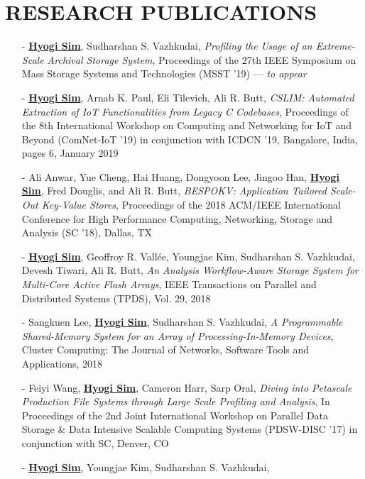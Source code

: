 \section{RESEARCH PUBLICATIONS} 
\begin{itemize}[leftmargin=*]
\setlength\itemsep{-0.02in}
\item[-] \underline{\bf Hyogi Sim}, Sudharshan S. Vazhkudai,
  {\it Profiling the Usage of an Extreme-Scale Archival Storage System},
  Proceedings of the 27th IEEE Symposium on Mass Storage Systems and Technologies (MSST '19)
  --- {\it \small to appear}

\item[-] \underline{\bf Hyogi Sim}, Arnab K. Paul, Eli Tilevich, Ali R. Butt,
  {\it CSLIM: Automated Extraction of IoT Functionalities from Legacy C Codebases},
  Proceedings of the 8th International Workshop on Computing and Networking for
  IoT and Beyond (ComNet-IoT ’19) in conjunction with ICDCN '19, Bangalore,
  India, pages 6, January 2019
\item[-] Ali Anwar, Yue Cheng, Hai Huang, Dongyoon Lee, Jingoo Han, \underline{\bf Hyogi Sim},
  Fred Douglis, and Ali R. Butt,
  {\it BESPOKV: Application Tailored Scale-Out Key-Value Stores},
  Proceedings of the 2018 ACM/IEEE International Conference for High
  Performance Computing, Networking, Storage and Analysis (SC '18), Dallas, TX 
\item[-] \underline{\bf Hyogi Sim}, Geoffroy R. Vall\'ee, 
	Youngjae Kim, Sudharshan S. Vazhkudai, Devesh Tiwari, Ali R. Butt,
  {\it An Analysis Workflow-Aware Storage System for Multi-Core Active Flash Arrays},
  IEEE Transactions on Parallel and Distributed Systems (TPDS), Vol. 29, 2018
\item[-] Sangkuen Lee, \underline{\bf Hyogi Sim}, Sudharshan S. Vazhkudai,
  {\it A Programmable Shared-Memory System for an Array of Processing-In-Memory Devices},
  Cluster Computing: The Journal of Networks, Software Tools and Applications, 2018
\item[-] Feiyi Wang, \underline{\bf Hyogi Sim}, Cameron Harr, Sarp Oral,
  {\it Diving into Petascale Production File Systems through 
       Large Scale Profiling and Analysis},
  In Proceedings of the 2nd Joint International Workshop on Parallel Data Storage 
  \& Data Intensive Scalable Computing Systems (PDSW-DISC '17)
  in conjunction with SC, Denver, CO
\item[-] \underline{\bf Hyogi Sim}, Youngjae Kim, Sudharshan S. Vazhkudai,

\end{itemize}
